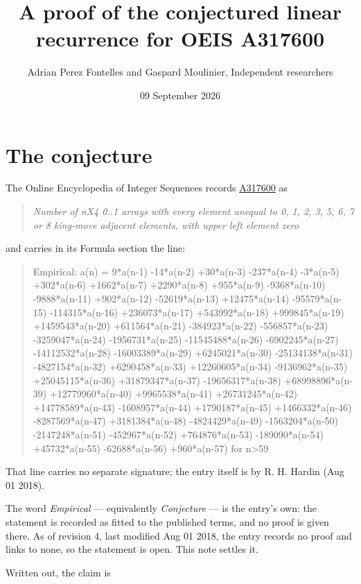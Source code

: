 \documentclass[11pt]{article}
\title{A proof of the conjectured linear recurrence for OEIS A317600}
\author{Adrian Perez Fontelles and Gaspard Moulinier, Independent researchers}
\date{09 September 2026}
\theoremstyle{definition}
\begin{document}
\maketitle
\section{The conjecture}

The Online Encyclopedia of Integer Sequences records \href{https://oeis.org/A317600}{A317600} as

\begin{quote}\itshape Number of nX4 0..1 arrays with every element unequal to 0, 1, 2, 3, 5, 6, 7 or 8 king-move adjacent elements, with upper left element zero\end{quote}

and carries in its Formula section the line:

\begin{quote}\ttfamily Empirical: a(n) = 9*a(n-1) -14*a(n-2) +30*a(n-3) -237*a(n-4) -3*a(n-5) +302*a(n-6) +1662*a(n-7) +2290*a(n-8) +955*a(n-9) -9368*a(n-10) -9888*a(n-11) +902*a(n-12) -52619*a(n-13) +12475*a(n-14) -95579*a(n-15) -114315*a(n-16) +236073*a(n-17) +543992*a(n-18) +999845*a(n-19) +1459543*a(n-20) +611564*a(n-21) -384923*a(n-22) -556857*a(n-23) -3259047*a(n-24) -1956731*a(n-25) -11545488*a(n-26) -6902245*a(n-27) -14112532*a(n-28) -16003389*a(n-29) +6245021*a(n-30) -25134138*a(n-31) -4827154*a(n-32) +6290458*a(n-33) +12260605*a(n-34) -9136962*a(n-35) +25045115*a(n-36) +31879347*a(n-37) -19656317*a(n-38) +68998896*a(n-39) +12779960*a(n-40) +9965538*a(n-41) +26731245*a(n-42) +14778589*a(n-43) -1608957*a(n-44) +1790187*a(n-45) +1466332*a(n-46) -8287569*a(n-47) +3181384*a(n-48) -4824429*a(n-49) -1563204*a(n-50) -2147248*a(n-51) -452967*a(n-52) +764876*a(n-53) -189090*a(n-54) +45732*a(n-55) -62688*a(n-56) +960*a(n-57) for n>59\end{quote}

That line carries no separate signature; the entry itself is by R. H. Hardin (Aug 01 2018).

The word {\itshape Empirical} --- equivalently {\itshape Conjecture} --- is the entry's own: the statement is recorded as fitted to the published terms, and no proof is given there. As of revision 4, last modified Aug 01 2018, the entry records no proof and links to none, so the statement is open. This note settles it.

Written out, the claim is
\end{document}
